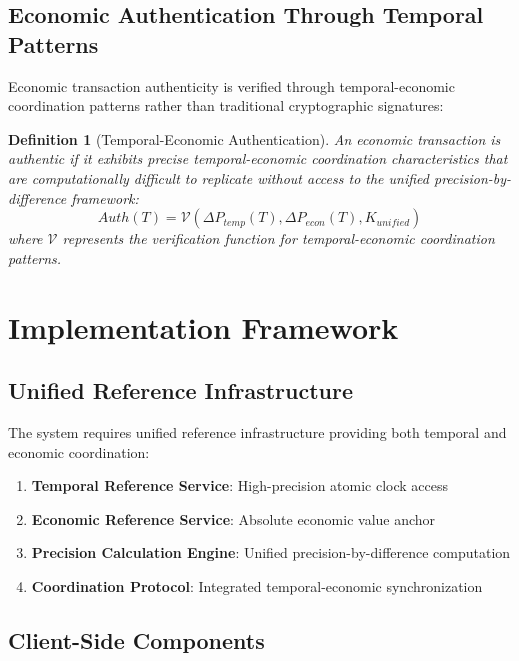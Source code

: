 \documentclass[12pt,a4paper]{article}
\newtheorem{definition}[theorem]{Definition}
\begin{document}
\subsection{Economic Authentication Through Temporal Patterns}

Economic transaction authenticity is verified through temporal-economic coordination patterns rather than traditional cryptographic signatures:

\begin{definition}[Temporal-Economic Authentication]
An economic transaction is authentic if it exhibits precise temporal-economic coordination characteristics that are computationally difficult to replicate without access to the unified precision-by-difference framework:
\begin{equation}
Auth(T) = \mathcal{V}(\Delta P_{temp}(T), \Delta P_{econ}(T), K_{unified})
\end{equation}
where $\mathcal{V}$ represents the verification function for temporal-economic coordination patterns.
\end{definition}

\section{Implementation Framework}

\subsection{Unified Reference Infrastructure}

The system requires unified reference infrastructure providing both temporal and economic coordination:

\begin{enumerate}
\item \textbf{Temporal Reference Service}: High-precision atomic clock access
\item \textbf{Economic Reference Service}: Absolute economic value anchor
\item \textbf{Precision Calculation Engine}: Unified precision-by-difference computation
\item \textbf{Coordination Protocol}: Integrated temporal-economic synchronization
\end{enumerate}

\subsection{Client-Side Components}
\end{document}
